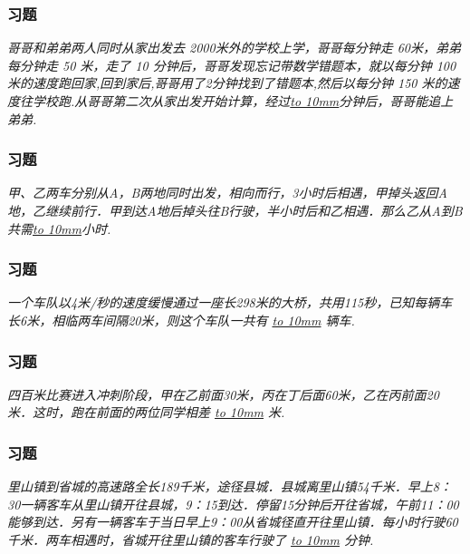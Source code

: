 \begin{frame}
    \frametitle{习题\theframecounter}
    \vspace*{-3cm}
    \textit{哥哥和弟弟两人同时从家出发去 2000米外的学校上学，哥哥每分钟走 60米，弟弟每分钟走 50 米，走了 10 分钟后，哥哥发现忘记带数学错题本，就以每分钟 100 米的速度跑回家,回到家后,哥哥用了2分钟找到了错题本,然后以每分钟 150 米的速度往学校跑.从哥哥第二次从家出发开始计算，经过\underline{\hbox to 10mm{}}分钟后，哥哥能追上弟弟.}
\end{frame}

\begin{frame}
    \frametitle{习题\theframecounter}
    \vspace*{-3cm}
    \textit{甲、乙两车分别从A，B两地同时出发，相向而行，3小时后相遇，甲掉头返回A地，乙继续前行．甲到达A地后掉头往B行驶，半小时后和乙相遇．那么乙从A到B共需\underline{\hbox to 10mm{}}小时.}
\end{frame}


\begin{frame}
    \frametitle{习题\theframecounter}
    \vspace*{-3cm}
    \textit{一个车队以4米/秒的速度缓慢通过一座长298米的大桥，共用115秒，已知每辆车长6米，相临两车间隔20米，则这个车队一共有 \underline{\hbox to 10mm{}} 辆车.}
\end{frame}

\begin{frame}
    \frametitle{习题\theframecounter}
    \vspace*{-3cm}
    \textit{四百米比赛进入冲刺阶段，甲在乙前面30米，丙在丁后面60米，乙在丙前面20米．这时，跑在前面的两位同学相差 \underline{\hbox to 10mm{}} 米.}
\end{frame}

\begin{frame}
    \frametitle{习题\theframecounter}
    \vspace*{-3cm}
    \textit{里山镇到省城的高速路全长189千米，途径县城．县城离里山镇54千米．早上8：30一辆客车从里山镇开往县城，9：15到达．停留15分钟后开往省城，午前11：00能够到达．另有一辆客车于当日早上9：00从省城径直开往里山镇．每小时行驶60千米．两车相遇时，省城开往里山镇的客车行驶了 \underline{\hbox to 10mm{}} 分钟.}
\end{frame}


